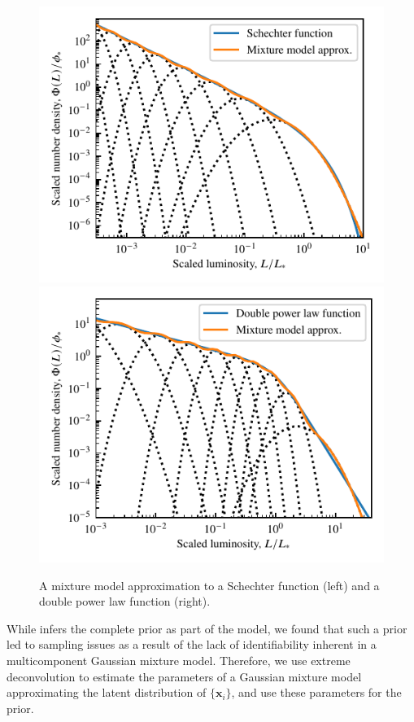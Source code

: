 \documentclass[fleqn,usenatbib]{rasti}
\newcommand{\indepvars}{\boldsymbol{x}_i}
\begin{document}
\begin{figure}
	\includegraphics[width=\columnwidth]{graphics/pdf_mixture_schechter.pdf}
	\includegraphics[width=\columnwidth]{
        graphics/pdf_mixture_double_power.pdf
    }
    \caption{A mixture model approximation to a Schechter function (left) and a
    double power law function (right).}
    \label{fig:formalism.mixture-prior}
\end{figure}

While \citeauthor{Kelly:2007} infers the complete prior as part
of the model, we found that such a prior led to sampling issues as a result of
the lack of identifiability inherent in a multicomponent Gaussian mixture model.
Therefore, we use extreme deconvolution \citep{Bovy:2011} to estimate the
parameters of a Gaussian mixture model approximating the latent distribution of
$\{\indepvars\}$, and use these parameters for the prior.
\end{document}

